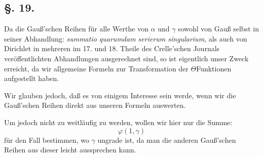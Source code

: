 \documentclass[10pt]{article}
\begin{document}
\subsection*{\S. 19.}
Da die Gauß'schen Reihen für alle Werthe von \(\alpha\) und \(\gamma\) sowohl von Gauß selbst in seiner Abhandlung: \textit{summatio quarumdam serierum singularium}, als auch von Dirichlet in mehreren im 17. und 18. Theile des Crelle'schen Journals veröffentlichten Abhandlungen ausgerechnet sind, so ist eigentlich unser Zweck erreicht, da wir allgemeine Formeln zur Transformation der \(\Theta\)Funktionen aufgestellt haben.

Wir glauben jedoch, daß es von einigem Interesse sein werde, wenn wir die Gauß'schen Reihen direkt aus unseren Formeln auswerten.

Um jedoch nicht zu weitläufig zu werden, wollen wir hier nur die Summe:
\[
\varphi(1,\gamma)
\]
für den Fall bestimmen, wo \(\gamma\) ungrade ist, da man die anderen Gauß'schen Reihen aus dieser leicht aussprechen kann.
\end{document}
